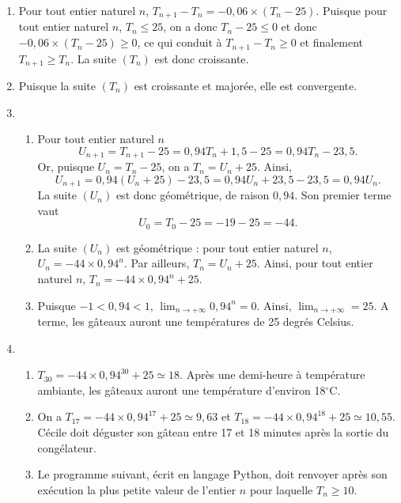 \documentclass[11pt,fleqn, openany]{book} %
\begin{document}
\begin{solution}
\begin{enumerate}
\item Pour tout entier naturel $n$, $ T_{n+1} - T_n = -0,06 \times (T_n - 25)$. Puisque pour tout entier naturel $n$, $T_n \leqslant 25$, on a donc $T_n-25 \leqslant 0$ et donc $-0,06 \times (T_n - 25) \geqslant 0$, ce qui conduit à $T_{n+1}-T_n \geqslant 0$ et finalement $T_{n+1} \geqslant T_n$. La suite $(T_n)$ est donc croissante.
\item Puisque la suite $(T_n)$ est croissante et majorée, elle est convergente. 
\item 
\begin{enumerate}
\item Pour tout entier naturel $n$
\[U_{n+1}=T_{n+1}-25 = 0,94T_n+1,5-25=0,94T_n-23,5.\]
Or, puisque $U_n=T_n-25$, on a $T_n=U_n+25$. Ainsi,
\[U_{n+1}=0,94(U_n+25)-23,5=0,94U_n+23,5-23,5=0,94U_n.\]
La suite $(U_n)$ est donc géométrique, de raison $0,94$. Son premier terme vaut
\[U_0  = T_0-25 = -19-25=-44.\]
\item La suite $(U_n)$ est géométrique : pour tout entier naturel $n$, $U_n = -44 \times 0,94^n$. Par ailleurs, $T_n=U_n+25$. Ainsi, pour tout entier naturel $n$, $T_n=-44\times 0,94^n+25$.
\item Puisque $-1<0,94<1$, $\displaystyle \lim _{n \to + \infty} 0,94^n=0$. Ainsi, $\displaystyle \lim _{n \to + \infty} =25$. A terme, les gâteaux auront une températures de 25 degrés Celsius.
\end{enumerate}
\item \begin{enumerate}
\item $T_{30}=-44 \times 0,94^{30}+25 \simeq 18$. Après une demi-heure à température ambiante, les gâteaux auront une température d'environ 18$^{\circ}$C.
\item  On a $T_{17}=-44 \times 0,94^{17}+25\simeq 9,63$ et $T_{18}=-44 \times 0,94^{18}+25\simeq 10,55$. Cécile doit déguster son gâteau entre 17 et 18 minutes après la sortie du congélateur. 

\item Le programme suivant, écrit en langage Python, doit renvoyer après son exécution la plus petite valeur de l'entier $n$ pour laquelle $T_n\geqslant 10$.



\end{enumerate}
\end{enumerate}

\end{solution}
 
 
\end{document}
